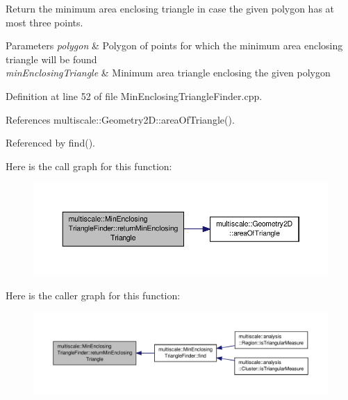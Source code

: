 Return the minimum area enclosing triangle in case the given polygon has at most three points. 


\begin{DoxyParams}{Parameters}
{\em polygon} & Polygon of points for which the minimum area enclosing triangle will be found \\
\hline
{\em min\-Enclosing\-Triangle} & Minimum area triangle enclosing the given polygon \\
\hline
\end{DoxyParams}


Definition at line 52 of file Min\-Enclosing\-Triangle\-Finder.\-cpp.



References multiscale\-::\-Geometry2\-D\-::area\-Of\-Triangle().



Referenced by find().



Here is the call graph for this function\-:\nopagebreak
\begin{figure}[H]
\begin{center}
\leavevmode
\includegraphics[width=350pt]{classmultiscale_1_1MinEnclosingTriangleFinder_af6e49a1ef5a0d4dbe3e25c2f92d69dc3_cgraph}
\end{center}
\end{figure}




Here is the caller graph for this function\-:\nopagebreak
\begin{figure}[H]
\begin{center}
\leavevmode
\includegraphics[width=350pt]{classmultiscale_1_1MinEnclosingTriangleFinder_af6e49a1ef5a0d4dbe3e25c2f92d69dc3_icgraph}
\end{center}
\end{figure}


